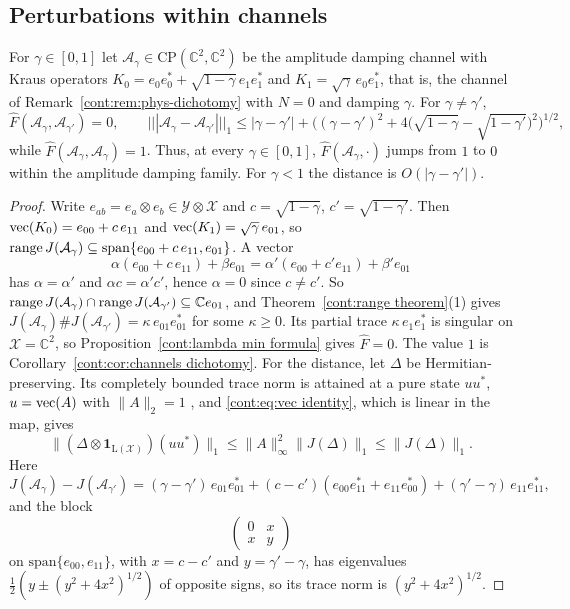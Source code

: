 \subsection*{Perturbations within channels} %

\begin{example}\label{cont:ex:amplitude damping}
For $\gamma\in[0,1]$ let $\mathcal{A}_\gamma\in\mathrm{CP}(\mathbb{C}^2,\mathbb{C}^2)$ be the amplitude damping channel with Kraus operators $K_0=e_0e_0^*+\sqrt{1-\gamma}\,e_1e_1^*$ and $K_1=\sqrt\gamma\,e_0e_1^*$, that is, the channel of Remark~\ref{cont:rem:phys-dichotomy} with $N=0$ and damping $\gamma$. For $\gamma\neq\gamma'$,
\[
\widehat{F}(\mathcal{A}_\gamma,\mathcal{A}_{\gamma'})=0,\qquad |||\mathcal{A}_\gamma-\mathcal{A}_{\gamma'}|||_1\leq|\gamma-\gamma'|+\Big((\gamma-\gamma')^2+4\big(\sqrt{1-\gamma}-\sqrt{1-\gamma'}\big)^2\Big)^{1/2},
\]
while $\widehat{F}(\mathcal{A}_\gamma,\mathcal{A}_\gamma)=1$. Thus, at every $\gamma\in[0,1]$, $\widehat{F}(\mathcal{A}_\gamma,\cdot)$ jumps from $1$ to $0$ within the amplitude damping family. For $\gamma<1$ the distance is $O(|\gamma-\gamma'|)$.
\end{example}

\begin{proof}
Write $e_{ab}=e_a\otimes e_b\in\mathcal{Y}\otimes\mathcal{X}$ and $c=\sqrt{1-\gamma}$, $c'=\sqrt{1-\gamma'}$. Then $\operatorname{vec}(K_0)=e_{00}+c\,e_{11}$ and $\operatorname{vec}(K_1)=\sqrt\gamma\,e_{01}$, so $\operatorname{range} J(\mathcal{A}_\gamma)\subseteq\mathrm{span}\{e_{00}+c\,e_{11},e_{01}\}$. A vector
\[
\alpha(e_{00}+c\,e_{11})+\beta e_{01}=\alpha'(e_{00}+c'e_{11})+\beta'e_{01}
\]
has $\alpha=\alpha'$ and $\alpha c=\alpha'c'$, hence $\alpha=0$ since $c\neq c'$. So $\operatorname{range} J(\mathcal{A}_\gamma)\cap\operatorname{range} J(\mathcal{A}_{\gamma'})\subseteq\mathbb{C}e_{01}$, and Theorem~\ref{cont:range theorem}(1) gives $J(\mathcal{A}_\gamma)\#J(\mathcal{A}_{\gamma'})=\kappa\,e_{01}e_{01}^*$ for some $\kappa\geq0$. Its partial trace $\kappa\,e_1e_1^*$ is singular on $\mathcal{X}=\mathbb{C}^2$, so Proposition~\ref{cont:lambda min formula} gives $\widehat{F}=0$. The value $1$ is Corollary~\ref{cont:cor:channels dichotomy}.
For the distance, let $\Delta$ be Hermitian-preserving. Its completely bounded trace norm is attained at a pure state $uu^*$, $u=\operatorname{vec}(A)$ with $\|A\|_2=1$ \cite[Section~3.3]{watrous2018theory}, and \eqref{cont:eq:vec identity}, which is linear in the map, gives
\[
\|(\Delta\otimes\mathbf{1}_{\mathrm{L}(\mathcal{X})})(uu^*)\|_1\leq\|A\|_\infty^2\|J(\Delta)\|_1\leq\|J(\Delta)\|_1.
\]
Here
\[
J(\mathcal{A}_\gamma)-J(\mathcal{A}_{\gamma'})=(\gamma-\gamma')\,e_{01}e_{01}^*+(c-c')(e_{00}e_{11}^*+e_{11}e_{00}^*)+(\gamma'-\gamma)\,e_{11}e_{11}^*,
\]
and the block
\[
\begin{pmatrix}0&x\\x&y\end{pmatrix}
\]
on $\mathrm{span}\{e_{00},e_{11}\}$, with $x=c-c'$ and $y=\gamma'-\gamma$, has eigenvalues $\frac12(y\pm(y^2+4x^2)^{1/2})$ of opposite signs, so its trace norm is $(y^2+4x^2)^{1/2}$.
\end{proof}

